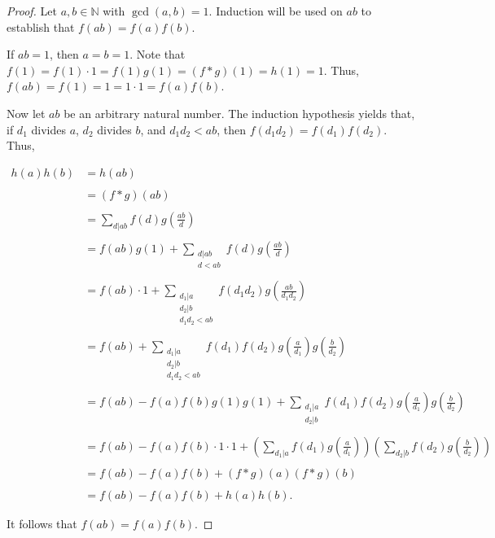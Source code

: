 \documentclass[12pt]{article}
\begin{document}
\begin{proof}
Let $a,b \in \mathbb{N}$ with $\gcd(a,b)=1$.  Induction will be used on $ab$ to establish that $f(ab)=f(a)f(b)$.

If $ab=1$, then $a=b=1$.  Note that $f(1)=f(1) \cdot 1=f(1)g(1)=(f*g)(1)=h(1)=1$.  Thus, $f(ab)=f(1)=1=1 \cdot 1=f(a)f(b)$.

Now let $ab$ be an arbitrary natural number.  The induction hypothesis yields that, if $d_1$ divides $a$, $d_2$ divides $b$, and $d_1d_2<ab$, then $f(d_1d_2)=f(d_1)f(d_2)$.  Thus,

\begin{center}
$\begin{array}{ll}
h(a)h(b) & =h(ab) \\
\\
& =(f*g)(ab) \\
\\
& \displaystyle =\sum_{d|ab} f(d)g\left( \frac{ab}{d} \right) \\
\\
& \displaystyle =f(ab)g(1)+\sum_{\substack{d|ab \\ d<ab}} f(d)g\left( \frac{ab}{d} \right) \\
\\
& \displaystyle =f(ab)\cdot 1+\sum_{\substack{d_1|a \\ d_2|b \\ d_1d_2<ab}} f(d_1d_2)g\left( \frac{ab}{d_1d_2} \right) \\
\\
& \displaystyle =f(ab)+\sum_{\substack{d_1|a \\ d_2|b \\ d_1d_2<ab}} f(d_1)f(d_2)g\left( \frac{a}{d_1} \right) g\left( \frac{b}{d_2} \right) \\
\\
& \displaystyle =f(ab)-f(a)f(b)g(1)g(1)+\sum_{\substack{d_1|a \\ d_2|b}} f(d_1)f(d_2)g\left( \frac{a}{d_1} \right) g\left( \frac{b}{d_2} \right) \\
\\
& \displaystyle =f(ab)-f(a)f(b)\cdot 1 \cdot 1+\left( \sum_{d_1|a} f(d_1)g\left( \frac{a}{d_1} \right) \right) \left( \sum_{d_2|b} f(d_2)g\left( \frac{b}{d_2} \right) \right) \\
\\
& =f(ab)-f(a)f(b)+(f*g)(a)(f*g)(b) \\
\\
& =f(ab)-f(a)f(b)+h(a)h(b). \end{array}$
\end{center}

It follows that $f(ab)=f(a)f(b)$.
\end{proof}
\end{document}
